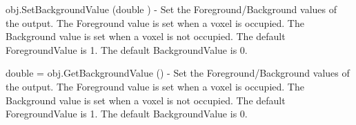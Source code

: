 \begin{DoxyItemize}
\item {\ttfamily obj.\-Set\-Background\-Value (double )} -\/ Set the Foreground/\-Background values of the output. The Foreground value is set when a voxel is occupied. The Background value is set when a voxel is not occupied. The default Foreground\-Value is 1. The default Background\-Value is 0.  
\item {\ttfamily double = obj.\-Get\-Background\-Value ()} -\/ Set the Foreground/\-Background values of the output. The Foreground value is set when a voxel is occupied. The Background value is set when a voxel is not occupied. The default Foreground\-Value is 1. The default Background\-Value is 0.  
\end{DoxyItemize}